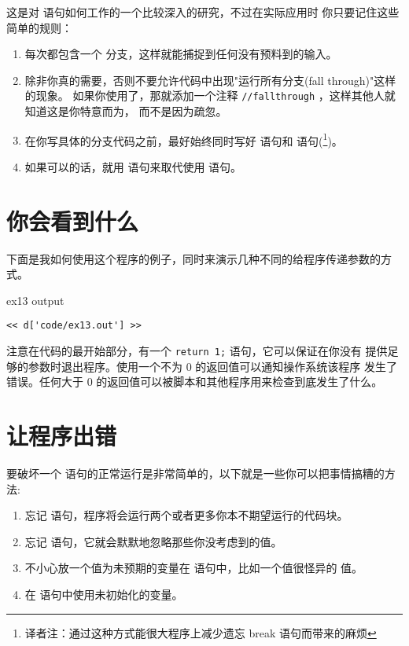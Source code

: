 这是对  语句如何工作的一个比较深入的研究，不过在实际应用时
你只要记住这些简单的规则：
\begin{enumerate}
\item 每次都包含一个  分支，这样就能捕捉到任何没有预料到的输入。
\item 除非你真的需要，否则不要允许代码中出现"运行所有分支(fall through)"这样的现象。
如果你使用了，那就添加一个注释 \verb|//fallthrough| ，这样其他人就知道这是你特意而为，
而不是因为疏忽。
\item 在你写具体的分支代码之前，最好始终同时写好  语句和  语句(\footnote{译者注：通过这种方式能很大程序上减少遗忘 break 语句而带来的麻烦})。
\item 如果可以的话，就用  语句来取代使用  语句。
\end{enumerate}

\section{你会看到什么}

下面是我如何使用这个程序的例子，同时来演示几种不同的给程序传递参数的方式。
\begin{code}{ex13 output}
\begin{lstlisting}
<< d['code/ex13.out'] >>
\end{lstlisting}
\end{code}

注意在代码的最开始部分，有一个 \verb|return 1;| 语句，它可以保证在你没有
提供足够的参数时退出程序。使用一个不为 0 的返回值可以通知操作系统该程序
发生了错误。任何大于 0 的返回值可以被脚本和其他程序用来检查到底发生了什么。

\section{让程序出错}

要破坏一个  语句的正常运行是非常简单的，以下就是一些你可以把事情搞糟的方法:
\begin{enumerate}
\item 忘记  语句，程序将会运行两个或者更多你本不期望运行的代码块。
\item 忘记  语句，它就会默默地忽略那些你没考虑到的值。
\item 不小心放一个值为未预期的变量在  语句中，比如一个值很怪异的  值。
\item 在  语句中使用未初始化的变量。
\end{enumerate}

